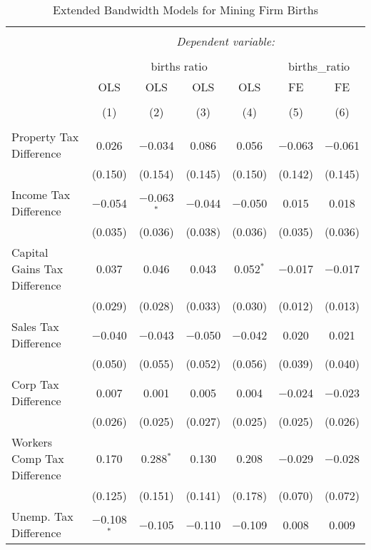 
\begin{table}[!htbp] \centering 
  \caption{Extended Bandwidth Models for  Mining Firm Births} 
  \label{21eb} 
\begin{tabular}{@{\extracolsep{5pt}}lcccccc} 
\\[-1.8ex]\hline 
\hline \\[-1.8ex] 
 & \multicolumn{6}{c}{\textit{Dependent variable:}} \\ 
\cline{2-7} 
\\[-1.8ex] & \multicolumn{4}{c}{births ratio} & \multicolumn{2}{c}{births\_ratio} \\ 
 & OLS & OLS & OLS & OLS & FE & FE \\ 
\\[-1.8ex] & (1) & (2) & (3) & (4) & (5) & (6)\\ 
\hline \\[-1.8ex] 
 Property Tax Difference & 0.026 & $-$0.034 & 0.086 & 0.056 & $-$0.063 & $-$0.061 \\ 
  & (0.150) & (0.154) & (0.145) & (0.150) & (0.142) & (0.145) \\ 
  Income Tax Difference & $-$0.054 & $-$0.063$^{*}$ & $-$0.044 & $-$0.050 & 0.015 & 0.018 \\ 
  & (0.035) & (0.036) & (0.038) & (0.036) & (0.035) & (0.036) \\ 
  Capital Gains Tax Difference & 0.037 & 0.046 & 0.043 & 0.052$^{*}$ & $-$0.017 & $-$0.017 \\ 
  & (0.029) & (0.028) & (0.033) & (0.030) & (0.012) & (0.013) \\ 
  Sales Tax Difference & $-$0.040 & $-$0.043 & $-$0.050 & $-$0.042 & 0.020 & 0.021 \\ 
  & (0.050) & (0.055) & (0.052) & (0.056) & (0.039) & (0.040) \\ 
  Corp Tax Difference & 0.007 & 0.001 & 0.005 & 0.004 & $-$0.024 & $-$0.023 \\ 
  & (0.026) & (0.025) & (0.027) & (0.025) & (0.025) & (0.026) \\ 
  Workers Comp Tax Difference & 0.170 & 0.288$^{*}$ & 0.130 & 0.208 & $-$0.029 & $-$0.028 \\ 
  & (0.125) & (0.151) & (0.141) & (0.178) & (0.070) & (0.072) \\ 
  Unemp. Tax Difference & $-$0.108$^{*}$ & $-$0.105 & $-$0.110 & $-$0.109 & 0.008 & 0.009 \\ 

\end{tabular}
\end{table}
